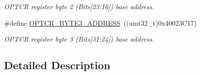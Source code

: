 \begin{DoxyCompactItemize}
\begin{DoxyCompactList}\small\item\em O\+P\+T\+CR register byte 2 (Bits\mbox{[}23\+:16\mbox{]}) base address. \end{DoxyCompactList}\item 
\#define \hyperlink{group___f_l_a_s_h___private___constants_gab0cdb1b585010a65ca09ecf67055fb94}{O\+P\+T\+C\+R\+\_\+\+B\+Y\+T\+E3\+\_\+\+A\+D\+D\+R\+E\+SS}~((uint32\+\_\+t)0x40023\+C17)\hypertarget{group___f_l_a_s_h___private___constants_gab0cdb1b585010a65ca09ecf67055fb94}{}\label{group___f_l_a_s_h___private___constants_gab0cdb1b585010a65ca09ecf67055fb94}

\begin{DoxyCompactList}\small\item\em O\+P\+T\+CR register byte 3 (Bits\mbox{[}31\+:24\mbox{]}) base address. \end{DoxyCompactList}\end{DoxyCompactItemize}


\subsection{Detailed Description}

